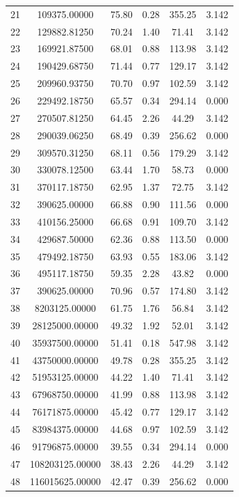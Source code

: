 \documentclass[11pt,twocolumn]{article}
\begin{document}
\begin{table}[t]
\begin{tabular}{ccrccc}
  21 & 109375.00000 & 75.80 & 0.28 & 355.25 & 3.142 \\
  22 & 129882.81250 & 70.24 & 1.40 & 71.41 & 3.142 \\
  23 & 169921.87500 & 68.01 & 0.88 & 113.98 & 3.142 \\
  24 & 190429.68750 & 71.44 & 0.77 & 129.17 & 3.142 \\
  25 & 209960.93750 & 70.70 & 0.97 & 102.59 & 3.142 \\
  26 & 229492.18750 & 65.57 & 0.34 & 294.14 & 0.000 \\
  27 & 270507.81250 & 64.45 & 2.26 & 44.29 & 3.142 \\
  28 & 290039.06250 & 68.49 & 0.39 & 256.62 & 0.000 \\
  29 & 309570.31250 & 68.11 & 0.56 & 179.29 & 3.142 \\
  30 & 330078.12500 & 63.44 & 1.70 & 58.73 & 0.000 \\
  31 & 370117.18750 & 62.95 & 1.37 & 72.75 & 3.142 \\
  32 & 390625.00000 & 66.88 & 0.90 & 111.56 & 0.000 \\
  33 & 410156.25000 & 66.68 & 0.91 & 109.70 & 3.142 \\
  34 & 429687.50000 & 62.36 & 0.88 & 113.50 & 0.000 \\
  35 & 479492.18750 & 63.93 & 0.55 & 183.06 & 3.142 \\
  36 & 495117.18750 & 59.35 & 2.28 & 43.82 & 0.000 \\
  37 & 390625.00000 & 70.96 & 0.57 & 174.80 & 3.142 \\
  38 & 8203125.00000 & 61.75 & 1.76 & 56.84 & 3.142 \\
  39 & 28125000.00000 & 49.32 & 1.92 & 52.01 & 3.142 \\
  40 & 35937500.00000 & 51.41 & 0.18 & 547.98 & 3.142 \\
  41 & 43750000.00000 & 49.78 & 0.28 & 355.25 & 3.142 \\
  42 & 51953125.00000 & 44.22 & 1.40 & 71.41 & 3.142 \\
  43 & 67968750.00000 & 41.99 & 0.88 & 113.98 & 3.142 \\
  44 & 76171875.00000 & 45.42 & 0.77 & 129.17 & 3.142 \\
  45 & 83984375.00000 & 44.68 & 0.97 & 102.59 & 3.142 \\
  46 & 91796875.00000 & 39.55 & 0.34 & 294.14 & 0.000 \\
  47 & 108203125.00000 & 38.43 & 2.26 & 44.29 & 3.142 \\
  48 & 116015625.00000 & 42.47 & 0.39 & 256.62 & 0.000 \\

\end{tabular}
\end{table}
\end{document}
